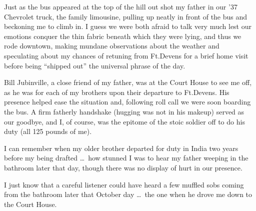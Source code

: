 \documentclass[../m3y]{subfiles}
\begin{document}
Just as the bus appeared at the top of the hill out shot my father in our '37 Chevrolet truck, the family limousine, pulling up neatly in front of the bus and beckoning me to climb in. I guess we were both afraid to talk very much lest our emotions conquer the thin fabric beneath which they were lying, and thus we rode downtown, making mundane observations about the weather and speculating about my chances of retuning from Ft.\@ Devens for a brief home visit before being ``shipped out'' the universal phrase of the day.

Bill Jubinville, a close friend of my father, was at the Court House to see me off, as he was for each of my brothers upon their departure to Ft.\@ Devens. His presence helped ease the situation and, following roll call we were soon boarding the bus. A firm fatherly handshake (hugging was not in his makeup) served as our goodbye, and I, of course, was the epitome of the stoic soldier off to do his duty (all 125 pounds of me).

I can remember when my older brother departed for duty in India two years before my being drafted \ldots\ how stunned I was to hear my father weeping in the bathroom later that day, though there was no display of hurt in our presence.

I just know that a careful listener could have heard a few muffled sobs coming from the bathroom later that October day \ldots\ the one when he drove me down to the Court House.
\end{document}
